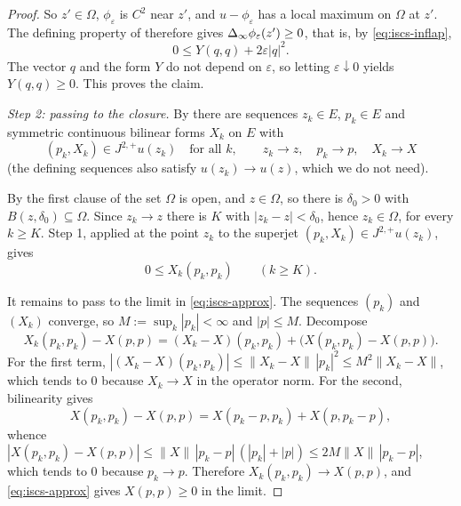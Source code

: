 \begin{proof}
So $z'\in\Omega$, $\phi_\varepsilon$ is $C^2$ near $z'$, and
$u-\phi_\varepsilon$ has a local maximum on $\Omega$ at $z'$. The defining
property of  therefore gives
$\Delta_{\infty}\phi_\varepsilon(z')\ge0$, that is, by \eqref{eq:iscs-inflap},
\[
  0\le Y(q,q)+2\varepsilon|q|^2 .
\]
The vector $q$ and the form $Y$ do not depend on $\varepsilon$, so letting
$\varepsilon\downarrow0$ yields $Y(q,q)\ge0$. This proves the claim.

\emph{Step 2: passing to the closure.}
By  there are sequences $z_k\in E$, $p_k\in E$ and
symmetric continuous bilinear forms $X_k$ on $E$ with
\[
  (p_k,X_k)\in J^{2,+}u(z_k)\quad\text{for all }k,
  \qquad z_k\to z,\quad p_k\to p,\quad X_k\to X
\]
(the defining sequences also satisfy $u(z_k)\to u(z)$, which we do not need).

By the first clause of  the set $\Omega$ is open, and
$z\in\Omega$, so there is $\delta_0>0$ with $B(z,\delta_0)\subseteq\Omega$.
Since $z_k\to z$ there is $K$ with $|z_k-z|<\delta_0$, hence $z_k\in\Omega$, for
every $k\ge K$. Step 1, applied at the point $z_k$ to the superjet
$(p_k,X_k)\in J^{2,+}u(z_k)$, gives
\begin{equation}\label{eq:iscs-approx}
  0\le X_k(p_k,p_k)\qquad(k\ge K).
\end{equation}

It remains to pass to the limit in \eqref{eq:iscs-approx}. The sequences $(p_k)$
and $(X_k)$ converge, so $M:=\sup_k|p_k|<\infty$ and $|p|\le M$. Decompose
\[
  X_k(p_k,p_k)-X(p,p)
   =(X_k-X)(p_k,p_k)+\bigl(X(p_k,p_k)-X(p,p)\bigr).
\]
For the first term, $|(X_k-X)(p_k,p_k)|\le\|X_k-X\|\,|p_k|^2\le M^2\|X_k-X\|$,
which tends to $0$ because $X_k\to X$ in the operator norm. For the second,
bilinearity gives
\[
  X(p_k,p_k)-X(p,p)=X(p_k-p,p_k)+X(p,p_k-p),
\]
whence $|X(p_k,p_k)-X(p,p)|\le\|X\|\,|p_k-p|\,(|p_k|+|p|)\le2M\|X\|\,|p_k-p|$,
which tends to $0$ because $p_k\to p$. Therefore
$X_k(p_k,p_k)\to X(p,p)$, and \eqref{eq:iscs-approx} gives $X(p,p)\ge0$ in the
limit.
\end{proof}
